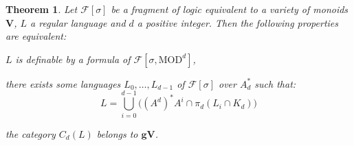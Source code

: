 \documentclass[submission,hidelink]{dmtcs-episciences}
\newtheorem{theorem}{Theorem}
\newcommand{\WF}{K}
\newcommand{\V}{\mathbf{V}}
\newcommand{\gV}{\mathbf{gV}}
\newcommand{\cF}{\mathcal{F}}
\newcommand{\Ae}{A_d}
\newcommand{\MOD}{\mathrm{MOD}}
\newenvironment{conditions}
{\begin{list}{\rm (\theenumi)}{\noindent \usecounter{enumi}\setlength{\topsep}{2pt}\setlength{\partopsep}{0pt}\setlength{\itemsep}{2pt}\setlength{\parsep}{0pt}\setlength{\leftmargin}{2.5em}\setlength{\labelwidth}{1.5em}\setlength{\labelsep}{0.5em}\setlength{\listparindent}{0pt}\setlength{\itemindent}{0pt}}}{\end{list}}
\begin{document}
		 \begin{theorem}	\label{thm:derivedcategory}
			Let $\cF[\sigma]$ be a fragment of logic equivalent to a variety of monoids $\V$,
			$L$ a regular language and $d$ a positive integer.
			Then the following properties are equivalent:
			\begin{conditions}
				\item\label{derivedcategory:1} $L$ is definable by a formula of $\cF[\sigma,\MOD^d]$,

				\item\label{derivedcategory:3} there exists
				      some languages $L_0,\ldots,L_{d-1}$ of
				      $\cF[\sigma]$ over $\Ae^*$ such that:\begin{equation}\label{equationLd}
				      L =\bigcup_{i=0}^{d-1}\big( (A^d)^*A^i\cap \pi_d(L_i\cap \WF_d)\big)
				      	      \tag{a}
				      \end{equation}
				\item\label{derivedcategory:2} the category $C_d(L)$ belongs to $\gV$.
			\end{conditions}
\end{theorem}
\end{document}
